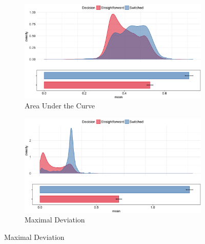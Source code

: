 \documentclass{article}
\begin{document}
\begin{figure}
\centering
\begin{subfigure}[b]{0.4\textwidth}
\includegraphics[width=\textwidth]{AUC_calibration.png}
\caption{Area Under the Curve}
\end{subfigure}
%
\begin{subfigure}[b]{0.4\textwidth}
\includegraphics[width=\textwidth]{MD_calibration.png}
\caption{Maximal Deviation}
\end{subfigure}


\end{figure}
\end{document}
